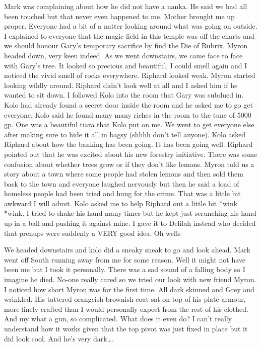 Mark was complaining about how he did not have a nanka. He said we had all been touched but that never even happened to me. Mother brought me up proper. Everyone had a bit of a natter looking around what was going on outside. I explained to everyone that the magic field in this temple was off the charts and we should honour Gary’s temporary sacrifice by find the Die of Rubrix. Myron headed down, very keen indeed. As we went downstairs, we came face to face with Gary’s tree. It looked so precious and beautiful. I could smell again and I noticed the vivid smell of rocks everywhere. Riphard looked weak. Myron started looking wildly around. Riphard didn’t look well at all and I asked him if he wanted to sit down. I followed Kolo into the room that Gary was subdued in. Kolo had already found a secret door inside the room and he asked me to go get everyone. Kolo said he found many many riches in the room to the tune of 5000 gp. One was a beautiful tiara that Kolo put on me. We went to get everyone else after making sure to hide it all in bagsy (shhhh don’t tell anyone). Kolo asked Riphard about how the banking has been going. It has been going well. Riphard pointed out that he was excited about his new forestry initiative. There was some confusion about whether trees grow or if they don’t like lemons. Myron told us a story about a town where some people had stolen lemons and then sold them back to the town and everyone laughed nervously but then he said a load of homeless people had been tried and hung for the crime. That was a little bit awkward I will admit. Kolo asked me to help Riphard out a little bit *wink *wink. I tried to shake his hand many times but he kept just scrunching his hand up in a ball and pushing it against mine. I gave it to Delilah instead who decided that prenups were suddenly a VERY good idea. Oh wells\medskip

We headed downstairs and kolo did a sneaky sneak to go and look ahead. Mark went off South running away from me for some reason. Well it might not have been me but I took it personally. There was a sad sound of a falling body so I imagine he died. No-one really cared so we tried our look with new friend Myron. I noticed how short Myron was for the first time. All dark skinned and Grey and wrinkled. His tattered orangeish brownish coat sat on top of his plate armour, more finely crafted than I would personally expect from the rest of his clothed. And my what a gun, so complicated. What does it even do? I can’t really understand how it works given that the top pivot was just fixed in place but it did look cool. And he’s very dark….\medskip

